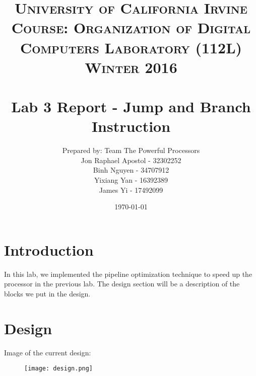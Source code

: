 \documentclass[paper=letter, fontsize=11pt]{scrartcl} %
\title{	
\normalfont \normalsize 
\textsc{University of California Irvine} 
\textsc{Course: Organization of Digital Computers Laboratory (112L) \\ Winter 2016} \\ [25pt]
\horrule{0.5pt} \\[0.4cm] %
\huge Lab 3 Report - Jump and Branch Instruction\/
\horrule{2pt} \\[0.5cm] %
}
\author{Prepared by: Team The Powerful Processors \\ Jon Raphael Apostol - 32302252 \\ Binh Nguyen - 34707912 \\ Yixiang Yan - 16392389 \\ James Yi - 17492099 } %
\date{\normalsize\today} %
\numberwithin{equation}{section}
\numberwithin{figure}{section}
\numberwithin{table}{section}
\begin{document}
\maketitle %


\section{Introduction}
In this lab, we implemented the pipeline optimization technique to speed up the processor in the previous lab. The design section will be a description of the blocks we put in the design.



\pagebreak


\section{Design}

\begin{center}
Image of the current design:
\end{center}

\begin{figure}[H]
	\centering
		\texttt{[image: design.png]}
	\label{fig:design}
\end{figure}
\end{document}

